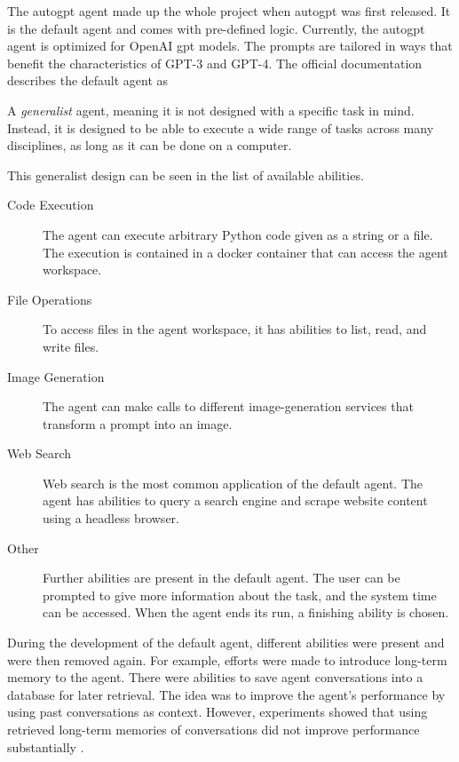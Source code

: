 \documentclass[../main.tex]{subfiles}
\begin{document}
The \gls{autogpt} agent made up the whole project when \gls{autogpt} was first released.
It is the default agent and comes with pre-defined logic.
Currently,
the \gls{autogpt} agent is optimized for OpenAI \gls{gpt} models.
The prompts are tailored in ways
that benefit the characteristics of GPT-3 and GPT-4.
The official documentation describes the default agent as
\begin{displayquote}
      A \emph{generalist} agent, meaning it is not designed with a specific task in mind.
      Instead, it is designed to be able to execute a wide range of tasks across many disciplines,
      as long as it can be done on a computer.
\end{displayquote}
This generalist design can be seen in the list of available abilities.
\begin{description}
      \item[Code Execution] The agent can execute arbitrary Python code given as a
            string or a file.
            The execution is contained in a docker container
            that can access the agent workspace.
      \item[File Operations] To access files in the agent workspace,
            it has abilities to list, read, and write files.
      \item[Image Generation]
            The agent can make calls to different image-generation services
            that transform a prompt into an image.
      \item[Web Search]
            Web search is the most common application of the default agent.
            The agent has abilities to query a search engine
            and scrape website content using a headless browser.
      \item[Other]
            Further abilities are present in the default agent.
            The user can be prompted to give more information about the task,
            and the system time can be accessed.
            When the agent ends its run, a finishing ability is chosen.
\end{description}

During the development of the default agent,
different abilities were present and were then removed again.
For example, efforts were made to introduce long-term memory to the agent.
There were abilities to save agent conversations into a database for later retrieval.
The idea was to improve the agent's performance by using past conversations as context.
However, experiments showed that using retrieved long-term memories of
conversations did not improve performance substantially \cite{Pwuts}.
\end{document}

